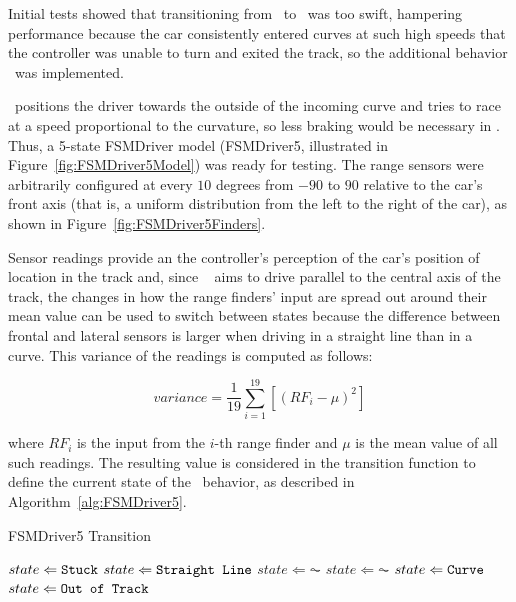 Initial tests showed that transitioning from \SL~to \C~was too swift, hampering performance because the car consistently entered curves at such high speeds that the controller was unable to turn and exited the track, so the additional behavior \AC~was implemented.

\AC~positions the driver towards the outside of the incoming curve and tries to race at a speed proportional to the curvature, so less braking would be necessary in \C. Thus, a 5-state FSMDriver model (FSMDriver5, illustrated in Figure~\ref{fig:FSMDriver5Model}) was ready for testing. The range sensors were arbitrarily configured at every $10$ degrees from $-90$ to $90$ relative to the car's front axis (that is, a uniform distribution from the left to the right of the car), as shown in Figure~\ref{fig:FSMDriver5Finders}.

Sensor readings provide an the controller's perception of the car's position of location in the track and, since \SL~ aims to drive parallel to the central axis of the track, the changes in how the range finders' input are spread out around their mean value can be used to switch between states because the difference between frontal and lateral sensors is larger when driving in a straight line than in a curve. This variance of the readings is computed as follows:

\begin{equation}
	variance = \frac{1}{19}\sum_{i=1}^{19}[(RF_i-\mu)^2]
\end{equation}

\noindent
where $RF_i$ is the input from the $i$-th range finder and $\mu$ is the mean value of all such readings. The resulting value is considered in the transition function to define the current state of the \racing~behavior, as described in Algorithm~\ref{alg:FSMDriver5}.

\begin{algorithm}[h]%
\caption{FSMDriver5 Transition}%
\label{alg:FSMDriver5}%
\begin{algorithmic}
        \STATE $state \Leftarrow \texttt{Stuck}$
    \ELSE
			\STATE $state \Leftarrow \texttt{Straight Line}$
			\STATE $state \Leftarrow \AC$
			\STATE $state \Leftarrow \AC$
			\STATE $state \Leftarrow \texttt{Curve}$
		\ELSE
			\STATE $state \Leftarrow \texttt{Out of Track}$
		\ENDIF
	\ENDIF
\end{algorithmic}
\end{algorithm}

